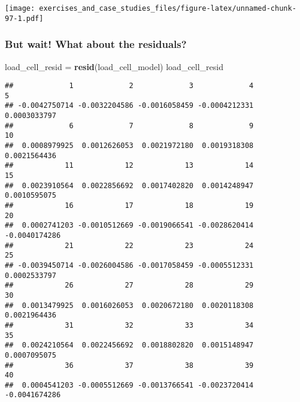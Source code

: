 \documentclass[]{book}
\newenvironment{Shaded}{\begin{snugshade}}{\end{snugshade}}
\newcommand{\CommentTok}[1]{\textcolor[rgb]{0.56,0.35,0.01}{\textit{#1}}}
\newcommand{\KeywordTok}[1]{\textcolor[rgb]{0.13,0.29,0.53}{\textbf{#1}}}
\newcommand{\NormalTok}[1]{#1}
\newcommand{\StringTok}[1]{\textcolor[rgb]{0.31,0.60,0.02}{#1}}
\theoremstyle{definition}
\theoremstyle{definition}
\theoremstyle{definition}
\theoremstyle{remark}
\begin{document}
\texttt{[image: exercises\_and\_case\_studies\_files/figure-latex/unnamed-chunk-97-1.pdf]}

\hypertarget{but-wait-what-about-the-residuals}{%
\subsubsection{But wait! What about the
residuals?}\label{but-wait-what-about-the-residuals}}

\begin{Shaded}
\begin{Highlighting}[]
\NormalTok{load_cell_resid =}\StringTok{ }\KeywordTok{resid}\NormalTok{(load_cell_model)}
\NormalTok{load_cell_resid}
\end{Highlighting}
\end{Shaded}

\begin{verbatim}
##             1             2             3             4             5 
## -0.0042750714 -0.0032204586 -0.0016058459 -0.0004212331  0.0003033797 
##             6             7             8             9            10 
##  0.0008979925  0.0012626053  0.0021972180  0.0019318308  0.0021564436 
##            11            12            13            14            15 
##  0.0023910564  0.0022856692  0.0017402820  0.0014248947  0.0010595075 
##            16            17            18            19            20 
##  0.0002741203 -0.0010512669 -0.0019066541 -0.0028620414 -0.0040174286 
##            21            22            23            24            25 
## -0.0039450714 -0.0026004586 -0.0017058459 -0.0005512331  0.0002533797 
##            26            27            28            29            30 
##  0.0013479925  0.0016026053  0.0020672180  0.0020118308  0.0021964436 
##            31            32            33            34            35 
##  0.0024210564  0.0022456692  0.0018802820  0.0015148947  0.0007095075 
##            36            37            38            39            40 
##  0.0004541203 -0.0005512669 -0.0013766541 -0.0023720414 -0.0041674286
\end{verbatim}

\begin{Shaded}
\end{Shaded}
\end{document}
